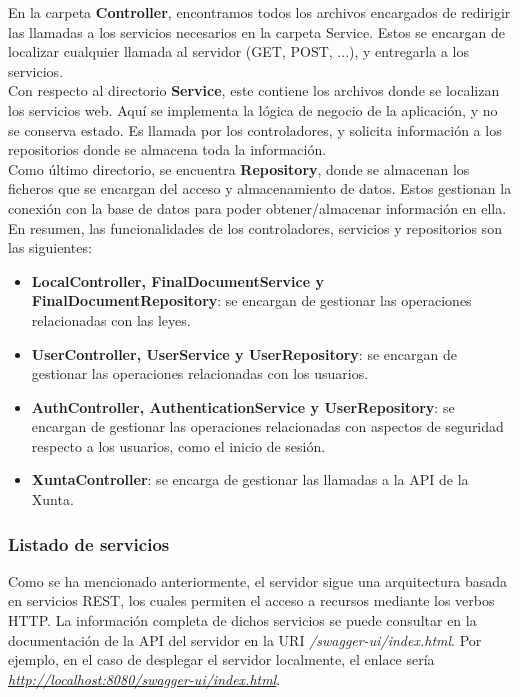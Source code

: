En la carpeta {\bf Controller}, encontramos todos los archivos encargados de redirigir las llamadas a los servicios necesarios en la carpeta Service. Estos se encargan de localizar cualquier llamada al servidor (GET, POST, ...), y entregarla a los servicios.
\\

Con respecto al directorio {\bf Service}, este contiene los archivos donde se localizan los servicios web. Aquí se implementa la lógica de negocio de la aplicación, y no se conserva estado. Es llamada por los controladores, y solicita información a los repositorios donde se almacena toda la información.
\\

Como último directorio, se encuentra {\bf Repository}, donde se almacenan los ficheros que se encargan del acceso y almacenamiento de datos. Estos gestionan la conexión con la base de datos para poder obtener/almacenar información en ella.
\\

En resumen, las funcionalidades de los controladores, servicios y repositorios son las siguientes:
\begin{itemize}
    \item {\bf LocalController, FinalDocumentService y FinalDocumentRepository}: se encargan de gestionar las operaciones relacionadas con las leyes.
    \item {\bf UserController, UserService y UserRepository}: se encargan de gestionar las operaciones relacionadas con los usuarios.
    \item {\bf AuthController, AuthenticationService y UserRepository}: se encargan de gestionar las operaciones relacionadas con aspectos de seguridad respecto a los usuarios, como el inicio de sesión.
    \item {\bf XuntaController}: se encarga de gestionar las llamadas a la API de la Xunta.
\end{itemize}

\subsubsection{Listado de servicios}

Como se ha mencionado anteriormente, el servidor sigue una arquitectura basada en servicios REST, los cuales permiten el acceso a recursos mediante los verbos HTTP. La información completa de dichos servicios se puede consultar en la documentación de la API del servidor en la URI {\it /swagger-ui/index.html}. Por ejemplo, en el caso de desplegar el servidor localmente, el enlace sería {\it \url{http://localhost:8080/swagger-ui/index.html}}.

